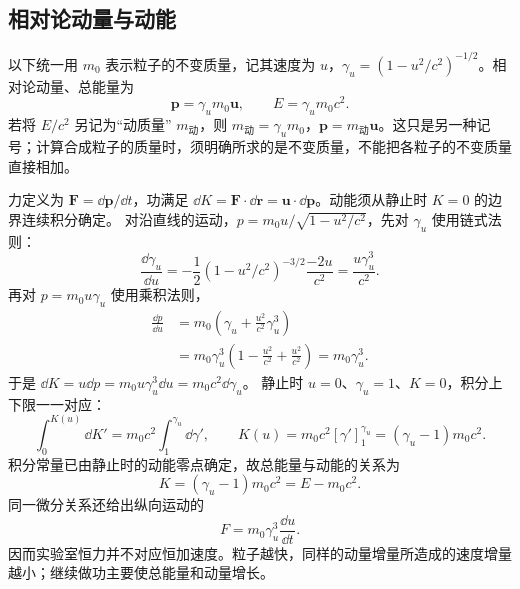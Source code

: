 \subsection{相对论动量与动能}

以下统一用 $m_0$ 表示粒子的不变质量，记其速度为 $u$，$\gamma_u=(1-u^2/c^2)^{-1/2}$。相对论动量、总能量为
\begin{equation}\label{eq:hrenergy}
\bm p=\gamma_um_0\bm u,\qquad E=\gamma_um_0c^2.
\end{equation}
若将 $E/c^2$ 另记为“动质量” $m_{\text{动}}$，则 $m_{\text{动}}=\gamma_um_0$，$\bm p=m_{\text{动}}\bm u$。这只是另一种记号；计算合成粒子的质量时，须明确所求的是不变质量，不能把各粒子的不变质量直接相加。

力定义为 $\bm F=\dd\bm p/\dd t$，功满足 $\dd K=\bm F\cdot\dd\bm r=\bm u\cdot\dd\bm p$。动能须从静止时 $K=0$ 的边界连续积分确定。
对沿直线的运动，$p=m_0u/\sqrt{1-u^2/c^2}$，先对 $\gamma_u$ 使用链式法则：
\[
 \frac{\dd\gamma_u}{\dd u}
 =-\frac12(1-u^2/c^2)^{-3/2}\frac{-2u}{c^2}
 =\frac{u\gamma_u^3}{c^2}.
\]
再对 $p=m_0u\gamma_u$ 使用乘积法则，
\begin{align*}
 \frac{\dd p}{\dd u}
 &=m_0\left(\gamma_u+\frac{u^2}{c^2}\gamma_u^3\right)\\
 &=m_0\gamma_u^3\left(1-\frac{u^2}{c^2}+\frac{u^2}{c^2}\right)
 =m_0\gamma_u^3.
\end{align*}
于是 $\dd K=u\dd p=m_0u\gamma_u^3\dd u=m_0c^2\dd\gamma_u$。
静止时 $u=0$、$\gamma_u=1$、$K=0$，积分上下限一一对应：
\[
 \int_0^{K(u)}\dd K'
 =m_0c^2\int_1^{\gamma_u}\dd\gamma',
 \qquad K(u)=m_0c^2[\gamma']_1^{\gamma_u}
 =(\gamma_u-1)m_0c^2.
\]
积分常量已由静止时的动能零点确定，故总能量与动能的关系为
\begin{equation}\label{eq:hrkinetic}
\boxed{K=(\gamma_u-1)m_0c^2=E-m_0c^2.}
\end{equation}
同一微分关系还给出纵向运动的
\[
F=m_0\gamma_u^3\frac{\dd u}{\dd t}.
\]
因而实验室恒力并不对应恒加速度。粒子越快，同样的动量增量所造成的速度增量越小；继续做功主要使总能量和动量增长。

